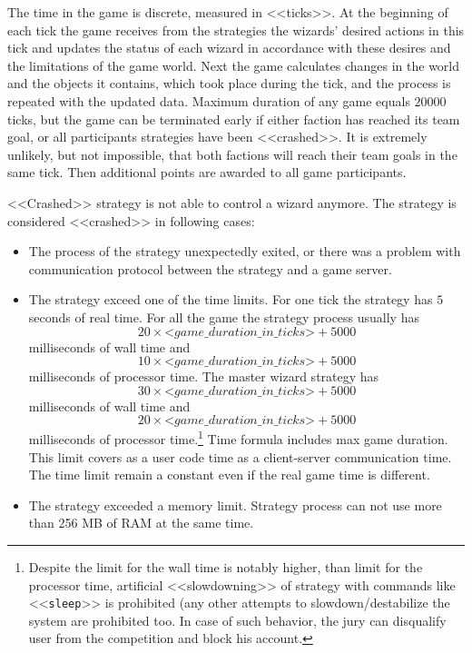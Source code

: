 The time in the game is discrete, measured in <<ticks>>. At the beginning of each tick the game receives from the strategies the wizards’ desired actions in this tick
and updates the status of each wizard in accordance with these desires and the limitations of the game world. Next the game calculates changes in the world and the objects it
contains, which took place during the tick, and the process is repeated with the updated data. Maximum duration of any game equals $20000$ ticks, but the game
can be terminated early if either faction has reached its team goal, or all participants strategies have been <<crashed>>. It is extremely
unlikely, but not impossible, that both factions will reach their team goals in the same tick. Then additional points
are awarded to all game participants.

<<Crashed>> strategy is not able to control a wizard anymore. The strategy is considered <<crashed>> in following cases: 
\begin{itemize}
  \item The process of the strategy unexpectedly exited, or there was a problem with communication protocol between the strategy and a game server. 
  \item The strategy exceed one of the time limits.
For one tick the strategy has $5$ seconds of real time. For all the game the strategy process usually has
        \begin{equation}
        20\times\textit{<game\_duration\_in\_ticks>}+5000
        \end{equation}
        milliseconds of wall time and
        \begin{equation}
        10\times\textit{<game\_duration\_in\_ticks>}+5000
        \end{equation}
        milliseconds of processor time. The master wizard strategy has
        \begin{equation}
        30\times\textit{<game\_duration\_in\_ticks>}+5000
        \end{equation}
        milliseconds of wall time and
        \begin{equation}
        20\times\textit{<game\_duration\_in\_ticks>}+5000
        \end{equation}
        milliseconds of processor time.\footnote[3]{Despite the limit for the wall time is notably higher, than limit for the processor time,
        artificial <<slowdowning>> of strategy with commands like <<\texttt{sleep}>> is prohibited (any  other attempts to slowdown/destabilize
        the system are prohibited too. In case of such behavior, the jury can disqualify user from the competition and block his account.}
        Time formula includes max game duration. This limit covers as a user code time as a client-server communication time.
        The time limit remain a constant even if the real game time is different.
  \item The strategy exceeded a memory limit. Strategy process can not use more than 256 MB of RAM at the same time.
\end{itemize}

